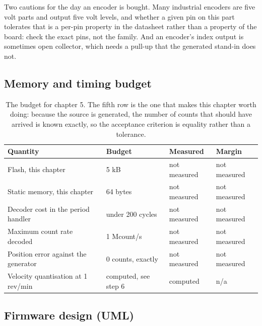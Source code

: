 Two cautions for the day an encoder is bought. Many industrial encoders are five
volt parts and output five volt levels, and whether a given pin on this part
tolerates that is a per-pin property in the datasheet rather than a property of
the board: check the exact pins, not the family. And an encoder's index output
is sometimes open collector, which needs a pull-up that the generated stand-in
does not.

\subsection*{Memory and timing budget}

\begin{table}[H]\centering\small
\begin{tabular}{p{44mm}p{28mm}p{28mm}p{30mm}}
\toprule
Quantity & Budget & Measured & Margin \\
\midrule
Flash, this chapter & 5 kB & not measured & not measured \\
Static memory, this chapter & 64 bytes & not measured & not measured \\
Decoder cost in the period handler & under 200 cycles & not measured & not measured \\
Maximum count rate decoded & 1 Mcount/s & not measured & not measured \\
Position error against the generator & 0 counts, exactly & not measured & not measured \\
Velocity quantisation at 1 rev/min & computed, see step 6 & computed & n/a \\
\bottomrule
\end{tabular}
\caption{The budget for chapter 5. The fifth row is the one that makes this chapter worth doing: because the source is generated, the number of counts that should have arrived is known exactly, so the acceptance criterion is equality rather than a tolerance.}
\end{table}

\subsection*{Firmware design (UML)}


